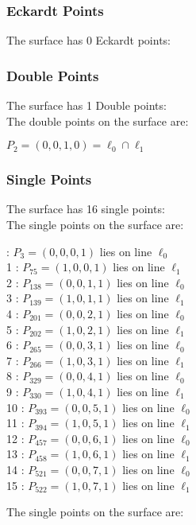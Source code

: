 \documentclass{article}
\begin{document}
{\subsubsection*{Eckardt Points}
The surface has 0 Eckardt points:\\
\subsubsection*{Double Points}
The surface has 1 Double points:\\
The double points on the surface are:\\
\begin{multicols}{2}
\noindent
$P_{2} = ( 0, 0, 1, 0 ) = \ell_{0} \cap \ell_{1} $\\
\end{multicols}
\subsubsection*{Single Points}
The surface has 16 single points:\\
The single points on the surface are:\\
\begin{multicols}{2}
 : $P_{3}=( 0, 0, 0, 1 )$ lies on line $\ell_{0}$\\
1 : $P_{75}=( 1, 0, 0, 1 )$ lies on line $\ell_{1}$\\
2 : $P_{138}=( 0, 0, 1, 1 )$ lies on line $\ell_{0}$\\
3 : $P_{139}=( 1, 0, 1, 1 )$ lies on line $\ell_{1}$\\
4 : $P_{201}=( 0, 0, 2, 1 )$ lies on line $\ell_{0}$\\
5 : $P_{202}=( 1, 0, 2, 1 )$ lies on line $\ell_{1}$\\
6 : $P_{265}=( 0, 0, 3, 1 )$ lies on line $\ell_{0}$\\
7 : $P_{266}=( 1, 0, 3, 1 )$ lies on line $\ell_{1}$\\
8 : $P_{329}=( 0, 0, 4, 1 )$ lies on line $\ell_{0}$\\
9 : $P_{330}=( 1, 0, 4, 1 )$ lies on line $\ell_{1}$\\
10 : $P_{393}=( 0, 0, 5, 1 )$ lies on line $\ell_{0}$\\
11 : $P_{394}=( 1, 0, 5, 1 )$ lies on line $\ell_{1}$\\
12 : $P_{457}=( 0, 0, 6, 1 )$ lies on line $\ell_{0}$\\
13 : $P_{458}=( 1, 0, 6, 1 )$ lies on line $\ell_{1}$\\
14 : $P_{521}=( 0, 0, 7, 1 )$ lies on line $\ell_{0}$\\
15 : $P_{522}=( 1, 0, 7, 1 )$ lies on line $\ell_{1}$\\
\end{multicols}
The single points on the surface are:\\
}
\end{document}
